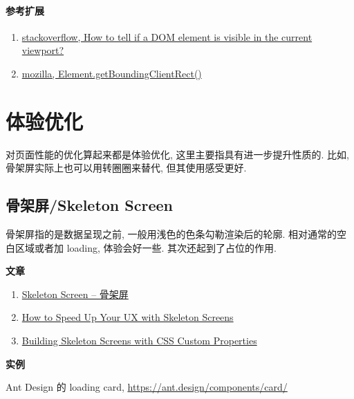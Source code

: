 \paragraph{参考扩展}\label{ux53c2ux8003ux6269ux5c55}

\begin{enumerate}
\def\labelenumi{\arabic{enumi}.}
\tightlist
\item
  \href{https://stackoverflow.com/questions/123999/how-to-tell-if-a-dom-element-is-visible-in-the-current-viewport\#7557433}{stackoverflow,
  How to tell if a DOM element is visible in the current viewport?}
\item
  \href{https://developer.mozilla.org/zh-CN/docs/Web/API/Element/getBoundingClientRect}{mozilla,
  Element.getBoundingClientRect()}
\end{enumerate}

\section{体验优化}\label{ux4f53ux9a8cux4f18ux5316}

对页面性能的优化算起来都是体验优化, 这里主要指具有进一步提升性质的.
比如, 骨架屏实际上也可以用转圈圈来替代, 但其使用感受更好.

\subsection{骨架屏/Skeleton
Screen}\label{ux9aa8ux67b6ux5c4fskeleton-screen}

骨架屏指的是数据呈现之前, 一般用浅色的色条勾勒渲染后的轮廓.
相对通常的空白区域或者加 loading, 体验会好一些. 其次还起到了占位的作用.

\textbf{文章}

\begin{enumerate}
\def\labelenumi{\arabic{enumi}.}
\tightlist
\item
  \href{http://www.bestvist.com/2018/01/19/skeleton-screen/}{Skeleton
  Screen -- 骨架屏}
\item
  \href{https://www.sitepoint.com/how-to-speed-up-your-ux-with-skeleton-screens/}{How
  to Speed Up Your UX with Skeleton Screens}
\item
  \href{https://css-tricks.com/building-skeleton-screens-css-custom-properties/}{Building
  Skeleton Screens with CSS Custom Properties}
\end{enumerate}

\textbf{实例}

Ant Design 的 loading card, \url{https://ant.design/components/card/}
